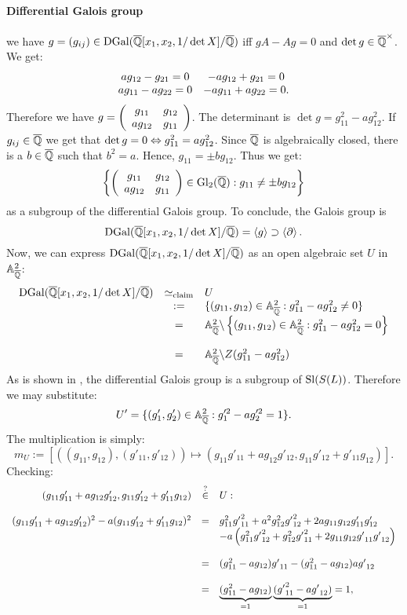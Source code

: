 \paragraph{Differential Galois group} we have $g = (g_{ij}) \in \trm{DGal}(\currfield[x_1,x_2,1/\det X]/\currfield)$ iff $g A - A g = 0$ and $\det g \in \currfield^\times$. We get:
$$\bao{cc}
a g_{12} - g_{21} = 0 & -a g_{12} + g_{21} = 0\\
a g_{11} - a g_{22} = 0 & -a g_{11} + a g_{22} = 0.\\
\ea$$
Therefore we have $g = \left(\bao{cc}
g_{11} & g_{12}\\
a g_{12} & g_{11}\\
\ea\right)$. The determinant is $\det g = g_{11}^2 - a g_{12}^2$. If $g_{ij} \in \currfield$ we get that $\det g = 0 \LRA g_{11}^2 = a g_{12}^2$. Since $\currfield$ is algebraically closed, there is a $b \in \currfield$ such that $b^2 = a$. Hence, $g_{11} = \pm b g_{12}$. Thus we get:
$$\left\{\left(
\bao{cc}
g_{11} & g_{12}\\
a g_{12} & g_{11}\\
\ea\right) \in \trm{Gl}_2(\currfield) : g_{11} \neq \pm b g_{12}\right\}$$
as a subgroup of the differential Galois group. To conclude, the Galois group is
$$\trm{DGal}(\currfield[x_1,x_2,1/\det X]/\currfield) = \left<g\right> \supset \left<\partial\right>.$$
Now, we can express $\trm{DGal}(\currfield[x_1,x_2,1/\det X]/\currfield)$ as an open algebraic set $U$ in $\aff{2}_{\currfield}$:
$$\bao{rcl}
\trm{DGal}(\currfield[x_1,x_2,1/\det X]/\currfield) &\simeq_{\trm{claim}}& U\\
 &:=& \{(g_{11},g_{12}) \in \aff{2}_{\currfield} : g_{11}^2 - a g_{12}^2 \neq 0\}\\
&=& \aff{2}_{\currfield} \bsl \left\{(g_{11},g_{12}) \in \aff{2}_{\currfield} : g_{11}^2 - a g_{12}^2 = 0\right\}\\
&&\\
&=& \aff{2}_{\currfield}\bsl Z(g_{11}^2 - a g_{12}^2)\\
\ea$$
As is shown in \cite{CohCuySte}, the differential Galois group is a subgroup of $\trm{Sl}(S(L))$. Therefore we may substitute:
$$U' = \{(g_1',g_2') \in \aff{2}_{\currfield} : g_1'^2 - a g_2'^2 = 1\}.$$
The multiplication is simply:
$$m_U := \left[\left((g_{11},g_{12}) , (g'_{11},g'_{12})\right) \longmapsto (g_{11} g'_{11} + a g_{12} g'_{12}, g_{11} g'_{12} + g'_{11} g_{12})\right].$$
Checking:
$$\bao{rcl}
(g_{11} g'_{11} + a g_{12} g'_{12}, g_{11} g'_{12} + g'_{11} g_{12}) &\stackrel{?}{\in}& U:\\
&&\\
(g_{11} g'_{11} + a g_{12} g'_{12})^2 - a (g_{11} g'_{12} + g'_{11} g_{12})^2 &=& g_{11}^2 {g'}_{11}^2 + a^2 g_{12}^2 {g'}_{12}^2 + 2 a g_{11} g_{12} g'_{11} g'_{12}\\
&&- a\left(g_{11}^2 {g'}_{12}^2 + g_{12}^2 {g'}_{11}^2 + 2 g_{11} g_{12} {g'}_{11} {g'}_{12}\right)\\
&&\\
&=& (g_{11}^2 - a g_{12}) {g'}_{11} - (g_{11}^2 - a g_{12}) a {g'}_{12}\\
&&\\
&=& \underbrace{(g_{11}^2 - a g_{12})}_{= 1} \underbrace{({g'}_{11}^2 - a {g'}_{12})}_{= 1} = 1,\\
\ea$$
